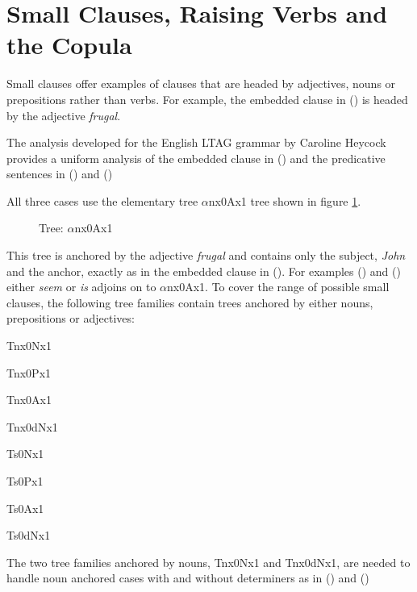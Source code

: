 \section{Small Clauses, Raising Verbs and the Copula}
Small clauses offer examples of clauses that are headed by adjectives, nouns or prepositions rather than verbs.  For example, the embedded clause in () is headed by the adjective {\it frugal}.



The analysis developed for the English LTAG grammar by Caroline Heycock provides a uniform analysis of the  embedded clause in () and the predicative sentences in () and ()


All three cases use the elementary tree $\alpha$nx0Ax1 tree shown in
figure \ref{nx0Ax1}. \\

\begin{figure}[htb]
\centerline{
}
\caption{\label{nx0Ax1} Tree:  $\alpha$nx0Ax1}
\end{figure}


This tree is anchored by the adjective {\it frugal\/} and contains
only the subject, {\it John\/} and the anchor, exactly as in the
embedded clause in ().  For examples () and ()
either {\it seem\/} or {\it is\/} adjoins on to $\alpha$nx0Ax1.  To
cover the range of possible small clauses, the following tree families
contain trees anchored by either nouns, prepositions or adjectives:

\begin{description}
\item Tnx0Nx1
\item Tnx0Px1
\item Tnx0Ax1
\item Tnx0dNx1
\item Ts0Nx1
\item Ts0Px1
\item Ts0Ax1
\item Ts0dNx1
\end{description}

The two tree families anchored by nouns, Tnx0Nx1 and Tnx0dNx1, are needed to handle noun anchored cases with and without determiners as in () and ()


